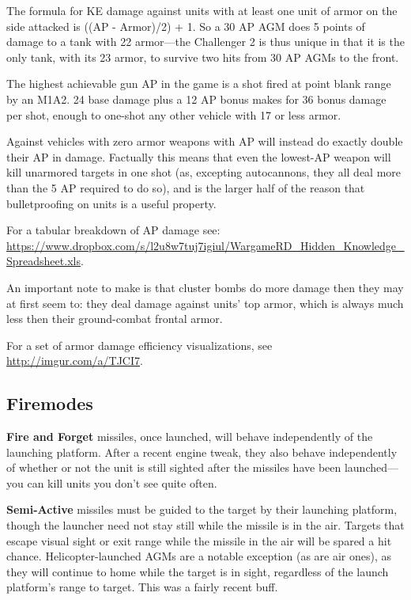 \documentclass{article}
\begin{document}
The formula for KE damage against units with at least one unit of armor on the
side attacked is ((AP - Armor)/2) + 1. So a 30 AP AGM does 5 points of damage to
a tank with 22 armor---the Challenger 2 is thus unique in that it is the only
tank, with its 23 armor, to survive two hits from 30 AP AGMs to the front.

The highest achievable gun AP in the game is a shot fired at point blank range
by an M1A2. 24 base damage plus a 12 AP bonus makes for 36 bonus damage per
shot, enough to one-shot any other vehicle with 17 or less armor.

Against vehicles with zero armor weapons with AP will instead do exactly
double their AP in damage. Factually this means that even the lowest-AP weapon
will kill unarmored targets in one shot (as, excepting autocannons, they all
deal more than the 5 AP required to do so), and is the larger half of the reason
that bulletproofing on units is a useful property.

For a tabular breakdown of AP damage see:
\url{https://www.dropbox.com/s/l2u8w7tuj7igiul/WargameRD_Hidden_Knowledge_Spreadsheet.xls}.

An important note to make is that cluster bombs do more damage then they may at
first seem to: they deal damage against units' top armor, which is always much
less then their ground-combat frontal armor.

For a set of armor damage efficiency visualizations, see
\url{http://imgur.com/a/TJCI7}.

\subsection{Firemodes}

\textbf{Fire and Forget} missiles, once launched, will behave independently of
the launching platform. After a recent engine tweak, they also behave
independently of whether or not the unit is still sighted after the missiles
have been launched---you can kill units you don't see quite often.

\textbf{Semi-Active} missiles must be guided to the target by their launching
platform, though the launcher need not stay still while the missile is in the
air. Targets that escape visual sight or exit range while the missile in
the air will be spared a hit chance. Helicopter-launched AGMs are a
notable exception (as are air ones), as they will continue to home while the
target is in sight, regardless of the launch platform's range to target. This
was a fairly recent buff.
\end{document}
